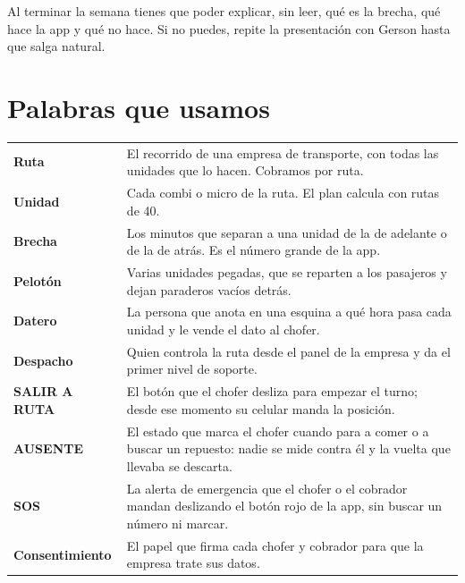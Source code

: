 \documentclass[a4paper]{article}
\begin{document}
Al terminar la semana tienes que poder explicar, sin leer, qué es la brecha, qué hace la app y qué no hace. Si no puedes, repite la presentación con Gerson hasta que salga natural.

\section{Palabras que usamos}

\begin{center}
\begin{tabularx}{\linewidth}{@{}>{\bfseries}p{3.4cm}X@{}}
\toprule
Ruta & El recorrido de una empresa de transporte, con todas las unidades que lo hacen. Cobramos por ruta.\\
Unidad & Cada combi o micro de la ruta. El plan calcula con rutas de 40.\\
Brecha & Los minutos que separan a una unidad de la de adelante o de la de atrás. Es el número grande de la app.\\
Pelotón & Varias unidades pegadas, que se reparten a los pasajeros y dejan paraderos vacíos detrás.\\
Datero & La persona que anota en una esquina a qué hora pasa cada unidad y le vende el dato al chofer.\\
Despacho & Quien controla la ruta desde el panel de la empresa y da el primer nivel de soporte.\\
SALIR A RUTA & El botón que el chofer desliza para empezar el turno; desde ese momento su celular manda la posición.\\
AUSENTE & El estado que marca el chofer cuando para a comer o a buscar un repuesto: nadie se mide contra él y la vuelta que llevaba se descarta.\\
SOS & La alerta de emergencia que el chofer o el cobrador mandan deslizando el botón rojo de la app, sin buscar un número ni marcar.\\
Consentimiento & El papel que firma cada chofer y cobrador para que la empresa trate sus datos.\\
\bottomrule
\end{tabularx}
\end{center}
\end{document}
